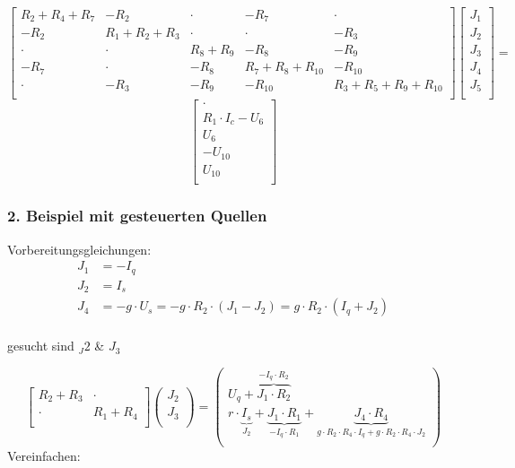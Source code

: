 \[
\begin{bmatrix}
    R_2 + R_4 + R_7 & - R_2 & \cdot & -R_7 & \cdot \\
    -R_2 & R_1 + R_2 + R_3 & \cdot & \cdot & - R_3 \\
    \cdot & \cdot & R_8 + R_9 & -R_8 & -R_9 \\
    -R_7 & \cdot & -R_8 & R_7 + R_8 + R_{10} & -R_{10} \\
    \cdot & -R_3 & -R_9 & -R_{10} & R_3 + R_5 + R_9 + R_{10} \\
\end{bmatrix}
\begin{bmatrix}
    J_1\\
    J_2\\
    J_3\\
    J_4\\
    J_5\\
\end{bmatrix}
=
\]
\[
\begin{bmatrix}
    \cdot\\
    R_1\cdot I_c - U_6\\
    U_6\\
    -U_{10}\\
    U_{10}\\
\end{bmatrix}
\]

\subsubsection{2. Beispiel mit gesteuerten Quellen}

\begin{center}
    
\end{center}

Vorbereitungsgleichungen:\\
\begin{align*}
    J_1 &= -I_q\\
    J_2 &= I_s\\
    J_4 &= -g\cdot U_s = -g\cdot R_2 \cdot (J_1 - J_2) = g\cdot R_2\cdot (I_q + J_2)\\ 
\end{align*}


gesucht sind $_J2$ \& $J_3$

\[
\begin{bmatrix}
    R_2 + R_3 & \cdot\\
    \cdot & R_1 + R_4\\
\end{bmatrix}
\begin{pmatrix}
    J_2\\
    J_3\\
\end{pmatrix}
=
\begin{pmatrix}
    U_q + \overbrace{J_1 \cdot R_2}^{-I_q \cdot R_2}  \\
    r\cdot \underbrace{I_s}_{J_2} + \underbrace{J_1 \cdot R_1}_{-I_q\cdot R_1} + \underbrace{J_4 \cdot R_4}_{g \cdot R_2 \cdot R_4 \cdot I_q + g \cdot R_2 \cdot R_4 \cdot J_2} \\
\end{pmatrix}
\]
Vereinfachen:


